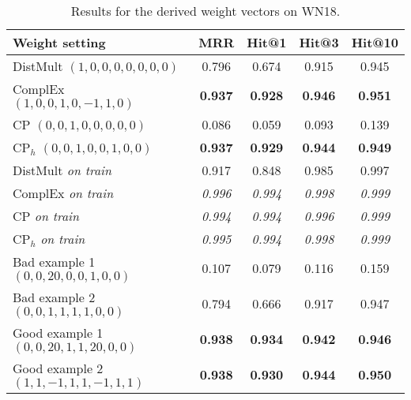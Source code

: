 \documentclass[sigconf,edbt]{acmart-edbt2019}
\begin{document}
\begin{table*}[ht]
\centering
	
	\caption{Results for the derived weight vectors on WN18.}
	\label{tab:result}
	
	\begin{tabular}{l|c|c|c|c}
		\hline 
		\textbf{Weight setting} & \textbf{MRR} & \textbf{Hit@1} & \textbf{Hit@3} & \textbf{Hit@10}\\ 
		\hline
		
		DistMult $ (1, 0, 0, 0, 0, 0, 0, 0) $ & 0.796 & 0.674 & 0.915 & 0.945\\ 
		ComplEx $ (1, 0, 0, 1, 0, -1, 1, 0) $ & \textbf{0.937} & \textbf{0.928} & \textbf{0.946} & \textbf{0.951}\\ 
		CP $ (0, 0, 1, 0, 0, 0, 0, 0) $ & 0.086 & 0.059 & 0.093 & 0.139\\ 
		CP$ _h $ $ (0, 0, 1, 0, 0, 1, 0, 0) $ & \textbf{0.937} & \textbf{0.929} & \textbf{0.944} & \textbf{0.949}\\ 
		\hline
		
		DistMult \textit{on train} & 0.917 & 0.848 & 0.985 & 0.997\\ 
		ComplEx \textit{on train} & \textit{0.996} & \textit{0.994} & \textit{0.998} & \textit{0.999}\\ 
		CP \textit{on train} & \textit{0.994} & \textit{0.994} & \textit{0.996} & \textit{0.999}\\ 
		CP$ _h $ \textit{on train} & \textit{0.995} & \textit{0.994} & \textit{0.998} & \textit{0.999}\\ 
		\hline
		
		Bad example 1 $ (0, 0, 20, 0, 0, 1, 0, 0) $ & 0.107 & 0.079 & 0.116 & 0.159\\ 
		Bad example 2 $ (0, 0, 1, 1, 1, 1, 0, 0) $ & 0.794 & 0.666 & 0.917 & 0.947\\ 
		
		Good example 1 $ (0, 0, 20, 1, 1, 20, 0, 0) $ & \textbf{0.938} & \textbf{0.934} & \textbf{0.942} & \textbf{0.946}\\
		Good example 2 $ (1, 1, -1, 1, 1, -1, 1, 1) $ & \textbf{0.938} & \textbf{0.930} & \textbf{0.944} & \textbf{0.950}\\ 
		\hline 
	\end{tabular}
\end{table*}
\end{document}
